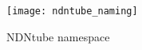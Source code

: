 \begin{figure}[htbp]
  \centering
  \texttt{[image: ndntube\_naming]}
  \vspace{-0.3cm}
  \caption{NDNtube namespace}
  \label{fig:ndntube_naming}
\end{figure}

